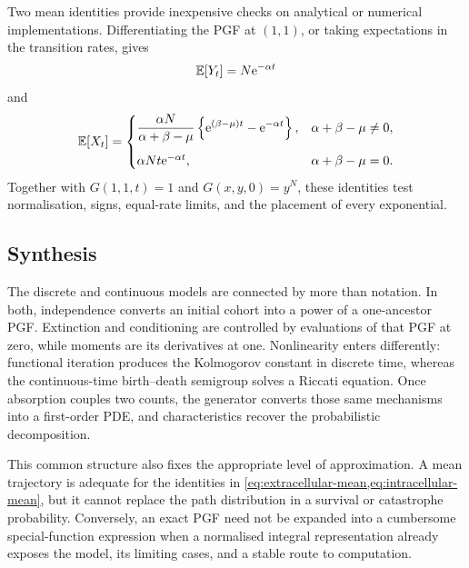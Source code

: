 Two mean identities provide inexpensive checks on analytical or numerical implementations.  Differentiating the PGF at $(1,1)$, or taking expectations in the transition rates, gives
\begin{equation}
  \mathbb{E}[Y_t]=N\mathrm{e}^{-\alpha t}
  \label{eq:extracellular-mean}
\end{equation}
and
\begin{equation}
  \mathbb{E}[X_t]
  =
  \begin{cases}
    \displaystyle
    \frac{\alpha N}
         {\alpha+\beta-\mu}
    \left\{\mathrm{e}^{(\beta-\mu)t}-\mathrm{e}^{-\alpha t}\right\},
      & \alpha+\beta-\mu\ne0,\\[4mm]
    \alpha Nt\mathrm{e}^{-\alpha t},
      & \alpha+\beta-\mu=0.
  \end{cases}
  \label{eq:intracellular-mean}
\end{equation}
Together with $G(1,1,t)=1$ and $G(x,y,0)=y^N$, these identities test normalisation, signs, equal-rate limits, and the placement of every exponential.

\subsection{Synthesis}
\label{sec:chapter-synthesis}

The discrete and continuous models are connected by more than notation.  In both, independence converts an initial cohort into a power of a one-ancestor PGF\@.  Extinction and conditioning are controlled by evaluations of that PGF at zero, while moments are its derivatives at one.  Nonlinearity enters differently: functional iteration produces the Kolmogorov constant in discrete time, whereas the continuous-time birth--death semigroup solves a Riccati equation.  Once absorption couples two counts, the generator converts those same mechanisms into a first-order PDE, and characteristics recover the probabilistic decomposition.

This common structure also fixes the appropriate level of approximation.  A mean trajectory is adequate for the identities in \cref{eq:extracellular-mean,eq:intracellular-mean}, but it cannot replace the path distribution in a survival or catastrophe probability.  Conversely, an exact PGF need not be expanded into a cumbersome special-function expression when a normalised integral representation already exposes the model, its limiting cases, and a stable route to computation.
